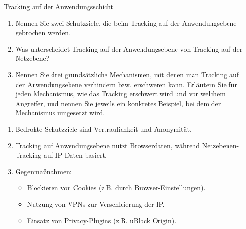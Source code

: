 \documentclass{article}
\begin{document}
\begin{exercise}{Tracking auf der Anwendungsschicht}
  \begin{enumerate}
    \item Nennen Sie zwei Schutzziele, die beim Tracking auf der Anwendungsebene gebrochen werden.
    \item Was unterscheidet Tracking auf der Anwendungsebene von Tracking auf der Netzebene?
    \item Nennen Sie drei grundsätzliche Mechanismen, mit denen man Tracking auf der Anwendungsebene verhindern bzw. erschweren kann. Erläutern Sie für jeden Mechanismus, wie das Tracking erschwert wird und vor welchem Angreifer, und nennen Sie jeweils ein konkretes Beispiel, bei dem der Mechanismus umgesetzt wird.
  \end{enumerate}

  \begin{solution}
    \begin{enumerate}
      \item Bedrohte Schutzziele sind Vertraulichkeit und Anonymität.
      \item Tracking auf Anwendungsebene nutzt Browserdaten, während Netzebenen-Tracking auf IP-Daten basiert.
      \item Gegenmaßnahmen:
        \begin{itemize}
          \item Blockieren von Cookies (z.B. durch Browser-Einstellungen).
          \item Nutzung von VPNs zur Verschleierung der IP.
          \item Einsatz von Privacy-Plugins (z.B. uBlock Origin).
        \end{itemize}
    \end{enumerate}
  \end{solution}
\end{exercise}
\end{document}
